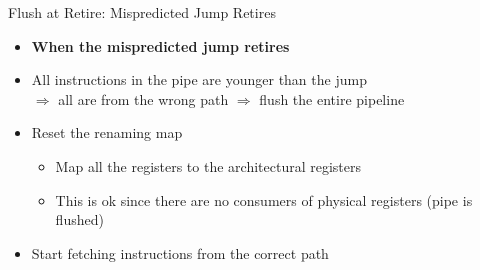 \documentclass[aspectratio=169,12pt]{beamer}
\begin{document}
\begin{frame}{Flush at Retire: Mispredicted Jump Retires}
    \vspace{1cm}
    \centering
    
    
    \begin{itemize}
        \item[]\textbf{When the mispredicted jump retires}
        \item All instructions in the pipe are younger than the jump \\
        $\Rightarrow$ all are from the wrong path $\Rightarrow$ flush the entire pipeline
        \item Reset the renaming map
        \begin{itemize}
            \item Map all the registers to the architectural registers
            \item This is ok since there are no consumers of physical registers (pipe is flushed)
        \end{itemize}
        \item Start fetching instructions from the correct path
    \end{itemize}
\end{frame}
\end{document}
